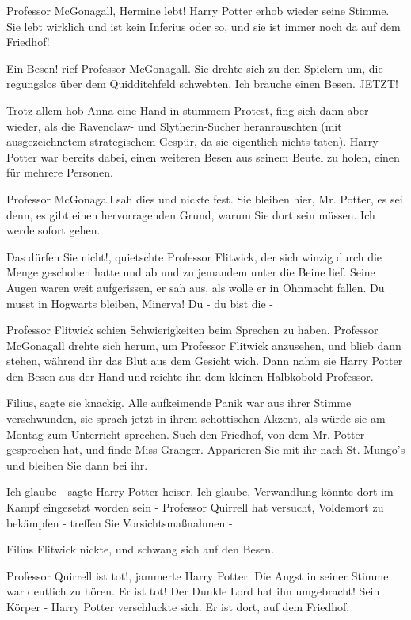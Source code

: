 \glqq{}Professor McGonagall, Hermine lebt!\grqq{} Harry Potter erhob wieder seine
Stimme. \glqq{}Sie lebt wirklich und ist kein Inferius oder so, und sie ist immer
noch da auf dem Friedhof!\grqq{}

\glqq{}Ein Besen!\grqq{} rief Professor McGonagall. Sie drehte sich zu den
Spielern um, die regungslos über dem Quidditchfeld schwebten. \glqq{}Ich brauche
einen Besen. JETZT!\grqq{}

Trotz allem hob Anna eine Hand in stummem Protest, fing sich dann aber wieder,
als die Ravenclaw- und Slytherin-Sucher heranrauschten (mit ausgezeichnetem
strategischem Gespür, da sie eigentlich nichts taten). Harry Potter war bereits
dabei, einen weiteren Besen aus seinem Beutel zu holen, einen für mehrere
Personen.

Professor McGonagall sah dies und nickte fest. \glqq{}Sie bleiben hier, Mr.
Potter, es sei denn, es gibt einen hervorragenden Grund, warum Sie dort sein
müssen. Ich werde sofort gehen.\grqq{}

\glqq{}Das dürfen Sie nicht!\grqq{}, quietschte Professor Flitwick, der sich
winzig durch die Menge geschoben hatte und ab und zu jemandem unter die Beine
lief. Seine Augen waren weit aufgerissen, er sah aus, als wolle er in Ohnmacht
fallen. \glqq{}Du musst in Hogwarts bleiben, Minerva! Du - du bist die -\grqq{}

Professor Flitwick schien Schwierigkeiten beim Sprechen zu haben. Professor
McGonagall drehte sich herum, um Professor Flitwick anzusehen, und blieb dann
stehen, während ihr das Blut aus dem Gesicht wich. Dann nahm sie Harry Potter
den Besen aus der Hand und reichte ihn dem kleinen Halbkobold Professor.

\glqq{}Filius\grqq{}, sagte sie knackig. Alle aufkeimende Panik war aus ihrer
Stimme verschwunden, sie sprach jetzt in ihrem schottischen Akzent, als würde
sie am Montag zum Unterricht sprechen. \glqq{}Such den Friedhof, von dem Mr.
Potter gesprochen hat, und finde Miss Granger. Apparieren Sie mit ihr nach St.
Mungo's und bleiben Sie dann bei ihr.\grqq{}

\glqq{}Ich glaube -\grqq{} sagte Harry Potter heiser. \glqq{}Ich glaube,
Verwandlung könnte dort im Kampf eingesetzt worden sein - Professor Quirrell hat
versucht, Voldemort zu bekämpfen - treffen Sie Vorsichtsmaßnahmen -\grqq{}

Filius Flitwick nickte, und schwang sich auf den Besen.

\glqq{}Professor Quirrell ist tot!\grqq{}, jammerte Harry Potter. Die Angst in
seiner Stimme war deutlich zu hören. \glqq{}Er ist tot! Der Dunkle Lord hat ihn
umgebracht! Sein Körper -\grqq{} Harry Potter verschluckte sich. \glqq{}Er ist
dort, auf dem Friedhof.\grqq{}

